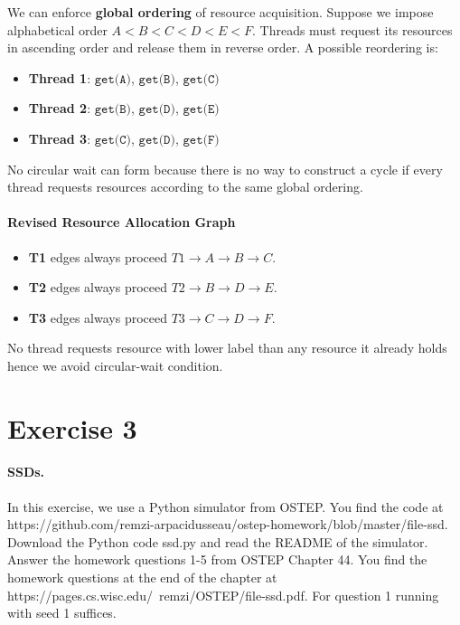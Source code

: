 \documentclass{article}
\newcommand{\exercise}[1]{
    \section*{Exercise #1}
    \markboth{Exercise #1}{}
}
\begin{document}
\begin{enumerate}[label=\textbf{\makebox[1cm][l]{\Huge\text{(\stylishfont\alph*)}}}, leftmargin=!, labelindent=0pt]
    We can enforce \textbf{global ordering} of resource acquisition. Suppose we impose
    alphabetical order \(A < B < C < D < E < F\). Threads must request its resources
    in ascending order and release them in reverse order. A possible reordering is:

    \begin{itemize}
        \item \textbf{Thread 1}: \(\texttt{get(A)}\), \(\texttt{get(B)}\), \(\texttt{get(C)}\) 
        \item \textbf{Thread 2}: \(\texttt{get(B)}\), \(\texttt{get(D)}\), \(\texttt{get(E)}\)
        \item \textbf{Thread 3}: \(\texttt{get(C)}\), \(\texttt{get(D)}\), \(\texttt{get(F)}\)
    \end{itemize}
    
    No circular wait can form because there is no way to construct a cycle if every thread
    requests resources according to the same global ordering.
    
    \paragraph{Revised Resource Allocation Graph}
    \begin{itemize}
        \item \textbf{T1} edges always proceed \(T1 \rightarrow A \rightarrow B \rightarrow C\).
        \item \textbf{T2} edges always proceed \(T2 \rightarrow B \rightarrow D \rightarrow E\).
        \item \textbf{T3} edges always proceed \(T3 \rightarrow C \rightarrow D \rightarrow F\).
    \end{itemize}
    No thread requests resource with lower label than any resource it already holds hence we
    avoid circular-wait condition.
\end{enumerate}






\newpage
\exercise{3}

\paragraph{SSDs.} In this exercise, we use a Python simulator from OSTEP. You find
the code at https://github.com/remzi-arpacidusseau/ostep-homework/blob/master/file-ssd.
Download the Python code ssd.py and read the README of the simulator. Answer the homework
questions 1-5 from OSTEP Chapter 44. You find the homework questions at the end of the chapter
at https://pages.cs.wisc.edu/~remzi/OSTEP/file-ssd.pdf. For question 1 running with seed 
1 suffices.\newline
\end{document}
